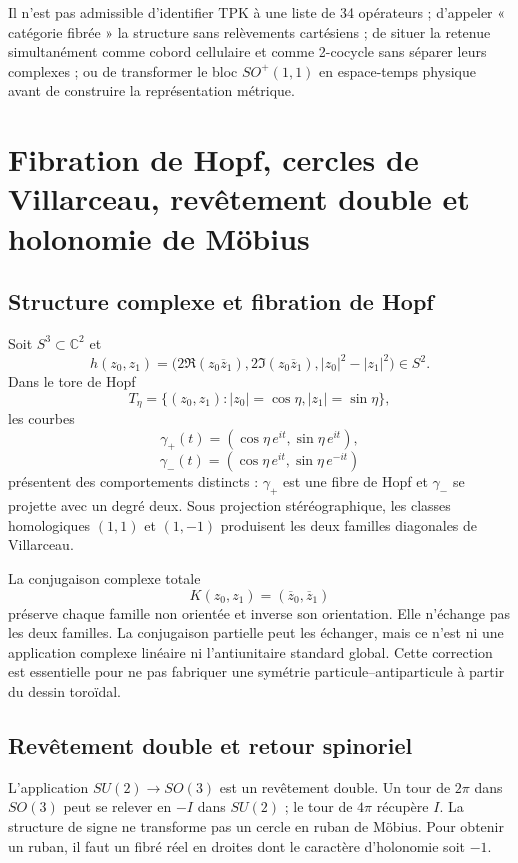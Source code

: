 \begin{falsadorBox}[title={Contrôles de type}]
Il n’est pas admissible d’identifier TPK à une liste de 34 opérateurs ; d’appeler
« catégorie fibrée » la structure sans relèvements cartésiens ; de situer la
retenue simultanément comme cobord cellulaire et comme 2-cocycle sans séparer leurs
complexes ; ou de transformer le bloc \(SO^+(1,1)\) en espace-temps physique avant
de construire la représentation métrique.
\end{falsadorBox}


\section{Fibration de Hopf, cercles de Villarceau, revêtement double et holonomie de Möbius}

\subsection{Structure complexe et fibration de Hopf}

Soit \(S^3\subset\mathbb C^2\) et
\[
h(z_0,z_1)=
\bigl(2\Re(z_0\overline z_1),
2\Im(z_0\overline z_1),|z_0|^2-|z_1|^2\bigr)
\in S^2.
\]
Dans le tore de Hopf
\[
T_\eta=\{(z_0,z_1):|z_0|=\cos\eta,
|z_1|=\sin\eta\},
\]
les courbes
\[
\gamma_+(t)=(\cos\eta\,e^{it},\sin\eta\,e^{it}),
\]
\[
\gamma_-(t)=(\cos\eta\,e^{it},\sin\eta\,e^{-it})
\]
présentent des comportements distincts : \(\gamma_+\) est une fibre de Hopf et
\(\gamma_-\) se projette avec un degré deux. Sous projection stéréographique, les
classes homologiques \((1,1)\) et \((1,-1)\) produisent les deux familles diagonales
de Villarceau.

La conjugaison complexe totale
\[
K(z_0,z_1)=(\overline z_0,\overline z_1)
\]
préserve chaque famille non orientée et inverse son orientation. Elle n’échange pas
les deux familles. La conjugaison partielle peut les échanger, mais ce n’est ni une
application complexe linéaire ni l’antiunitaire standard global. Cette correction
est essentielle pour ne pas fabriquer une symétrie particule--antiparticule à partir du
dessin toroïdal.

\subsection{Revêtement double et retour spinoriel}

L’application \(SU(2)\to SO(3)\) est un revêtement double. Un tour de
\(2\pi\) dans \(SO(3)\) peut se relever en \(-I\) dans \(SU(2)\) ; le tour de
\(4\pi\) récupère \(I\). La structure de signe ne transforme pas un cercle en
ruban de Möbius. Pour obtenir un ruban, il faut un fibré réel en droites
dont le caractère d’holonomie soit \(-1\).

